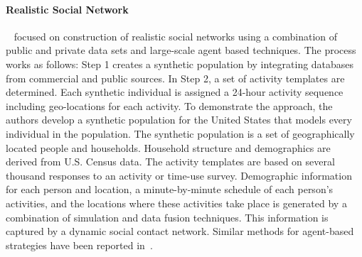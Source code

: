 
\paragraph{Realistic Social Network}
~\cite{Barrett:2009:GAL:1995456.1995598} focused on construction of
realistic social networks using a combination of public and private data sets
and large-scale agent based techniques. The process works as follows: Step 1
creates a synthetic population by integrating databases from commercial and
public sources. In Step 2, a set of activity templates are determined. Each
synthetic individual is assigned a 24-hour activity sequence including
geo-locations for each activity. To demonstrate the approach, the authors develop a synthetic population for the
United States that models every individual in the population. The synthetic
population is a set of geographically located people and households. Household
structure and demographics are derived from U.S. Census data. The activity
templates are  based on several thousand responses to an activity or time-use
survey. Demographic information for each person and location, a minute-by-minute
schedule of each person's activities, and the locations where these activities
take place is generated by a combination of simulation and data fusion
techniques. This information is captured by a dynamic social contact network. Similar methods for agent-based strategies have been reported in~\cite{Bernstein:2013:SAS:2499604.2499609}.

